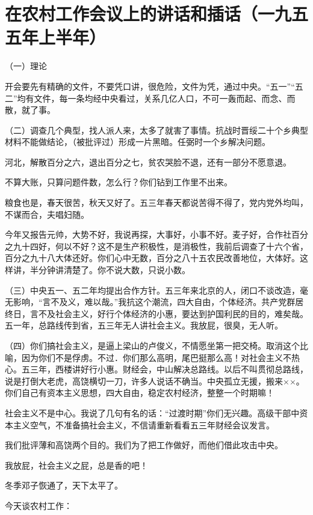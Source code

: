 \section[在农村工作会议上的讲话和插话（一九五五年上半年）]{在农村工作会议上的讲话和插话（一九五五年上半年）}


（一）理论

开会要先有精确的文件，不要凭口讲，很危险，文件为凭，通过中央。“五一”“五二”均有文件，每一条均经中央看过，关系几亿人口，不可一轰而起、而念、而散，就了事。

（二）调查几个典型，找人派人来，太多了就害了事情。抗战时晋绥二十个乡典型材料不能做结论，（被批评过）形成一片黑暗。任弼时一个乡解决问题。

河北，解散百分之六，退出百分之七，贫农哭脸不退，还有一部分不愿意退。

不算大账，只算问题件数，怎么行？你们钻到工作里不出来。

粮食也是，春天很苦，秋天又好了。五三年春天都说苦得不得了，党内党外均叫，不谋而合，夫唱妇随。

今年又报告元帅，大势不好，我说再探，大事好，小事不好。麦子好，合作社百分之九十四好，何以不好？这不是生产积极性，是消极性，我前后调查了十六个省，百分之九十八大体还好。你们心中无数，百分之八十五农民改善地位，大体好。这样讲，半分钟讲清楚了。你不说大数，只说小数。

（三）中央五一、五二年均提出合作方针。五三年来北京的人，闭口不谈改造，毫无影响，“言不及义，难以哉。”我抗这个潮流，四大自由，个体经济。共产党群居终日，言不及社会主义，好行个体经济的小惠，要达到护国利民的目的，难矣哉。五一年，总路线传到省，五三年无人讲社会主义。我放屁，很臭，无人听。

（四）你们搞社会主义，是逼上梁山的卢俊义，不情愿坐第一把交椅。取消这个比喻，因为你们不是俘虏。不过．你们那么高明，尾巴挺那么高！对社会主义不热心。五三年，西楼讲好行小惠。财经会，中山解决总路线。以后不叫贯彻总路线，说是打倒大老虎，高饶横切一刀，许多人说话不确当。中央孤立无援，搬来××。你们自己有资本主义思想，四大自由，稳定农村经济，整整一个时期嘛！

社会主义不是中心。我说了几句有名的话：“过渡时期”你们无兴趣。高级干部中资本主义空气，不准备搞社会主义，不信请重新看看五三年财经会议发言。

我们批评薄和高饶两个目的。我们为了把工作做好，而他们借此攻击中央。

我放屁，社会主义之屁，总是香的吧！

冬季邓子恢通了，天下太平了。

今天谈农村工作：

